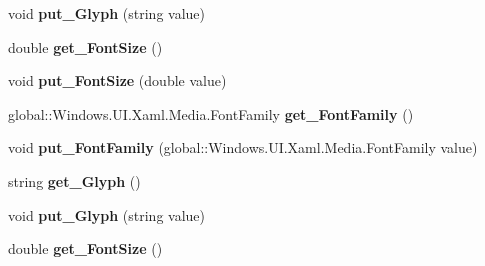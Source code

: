\begin{DoxyCompactItemize}
void {\bfseries put\+\_\+\+Glyph} (string value)
\item 
\mbox{\label{interface_windows_1_1_u_i_1_1_xaml_1_1_controls_1_1_i_font_icon_ab38ce1dfd80b0b587d2104020f6af58f}} 
double {\bfseries get\+\_\+\+Font\+Size} ()
\item 
\mbox{\label{interface_windows_1_1_u_i_1_1_xaml_1_1_controls_1_1_i_font_icon_ae3677531a4f648e82404282b2852bf18}} 
void {\bfseries put\+\_\+\+Font\+Size} (double value)
\item 
\mbox{\label{interface_windows_1_1_u_i_1_1_xaml_1_1_controls_1_1_i_font_icon_a9a70a7f083b2528d375f3a8262aae382}} 
global\+::\+Windows.\+U\+I.\+Xaml.\+Media.\+Font\+Family {\bfseries get\+\_\+\+Font\+Family} ()
\item 
\mbox{\label{interface_windows_1_1_u_i_1_1_xaml_1_1_controls_1_1_i_font_icon_ac80bf98a4d031b00224048236e74f7a1}} 
void {\bfseries put\+\_\+\+Font\+Family} (global\+::\+Windows.\+U\+I.\+Xaml.\+Media.\+Font\+Family value)
\item 
\mbox{\label{interface_windows_1_1_u_i_1_1_xaml_1_1_controls_1_1_i_font_icon_a7b89ee1452fbf6add71574383ec042ad}} 
string {\bfseries get\+\_\+\+Glyph} ()
\item 
\mbox{\label{interface_windows_1_1_u_i_1_1_xaml_1_1_controls_1_1_i_font_icon_a286f89cdc8e53df9aaa1bcae6107ea9f}} 
void {\bfseries put\+\_\+\+Glyph} (string value)
\item 
\mbox{\label{interface_windows_1_1_u_i_1_1_xaml_1_1_controls_1_1_i_font_icon_ab38ce1dfd80b0b587d2104020f6af58f}} 
double {\bfseries get\+\_\+\+Font\+Size} ()
\item 
\mbox{\label{interface_windows_1_1_u_i_1_1_xaml_1_1_controls_1_1_i_font_icon_ae3677531a4f648e82404282b2852bf18}} 

\end{DoxyCompactItemize}
